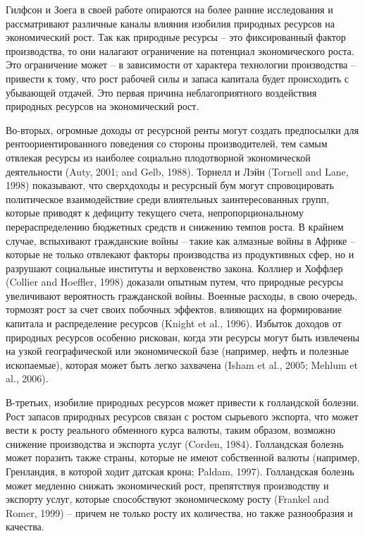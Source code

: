 \documentclass[12pt,a4paper, oneside]{extreport}
\begin{document}
Гилфсон и Зоега в своей работе опираются на более ранние исследования и рассматривают различные каналы влияния изобилия природных ресурсов на экономический рост. Так как природные ресурсы – это фиксированный фактор производства, то они налагают ограничение на потенциал экономического роста. Это ограничение может – в зависимости от характера технологии производства – привести к тому, что рост рабочей силы и запаса капитала будет происходить с убывающей отдачей. Это первая причина неблагоприятного воздействия природных ресурсов на экономический рост. 

Во-вторых, огромные доходы от ресурсной ренты могут создать предпосылки для рентоориентированного поведения со стороны производителей, тем самым отвлекая ресурсы из наиболее социально плодотворной экономической деятельности (Auty, 2001; and Gelb, 1988). Торнелл и Лэйн (Tornell and Lane, 1998) показывают, что сверхдоходы и ресурсный бум могут спровоцировать политическое взаимодействие среди влиятельных заинтересованных групп, которые приводят к дефициту текущего счета, непропорциональному перераспределению бюджетных средств и снижению темпов роста. В крайнем случае, вспыхивают гражданские войны – такие как алмазные войны в Африке – которые не только отвлекают факторы производства из продуктивных сфер, но и разрушают социальные институты и верховенство закона. Коллиер и Хоффлер (Collier and Hoeffler, 1998) доказали опытным путем, что природные ресурсы увеличивают вероятность гражданской войны. Военные расходы, в свою очередь, тормозят рост за счет своих побочных эффектов, влияющих на формирование капитала и распределение ресурсов (Knight et al., 1996). Избыток доходов от природных ресурсов особенно рискован, когда эти ресурсы могут быть извлечены на узкой географической или экономической базе (например, нефть и полезные ископаемые), которая может быть легко захвачена (Isham et al., 2005; Mehlum et al., 2006).

В-третьих, изобилие природных ресурсов может привести к голландской болезни. Рост запасов природных ресурсов связан с ростом сырьевого экспорта, что может вести к росту реального обменного курса валюты, таким образом, возможно снижение производства и экспорта услуг (Corden, 1984). Голландская болезнь может поразить также страны, которые не имеют собственной валюты (например, Гренландия, в которой ходит датская крона; Paldam, 1997). Голландская болезнь может медленно снижать экономический рост, препятствуя производству и экспорту услуг, которые способствуют экономическому росту (Frankel and Romer, 1999) – причем не только росту их количества, но также разнообразия и качества.
\end{document}
